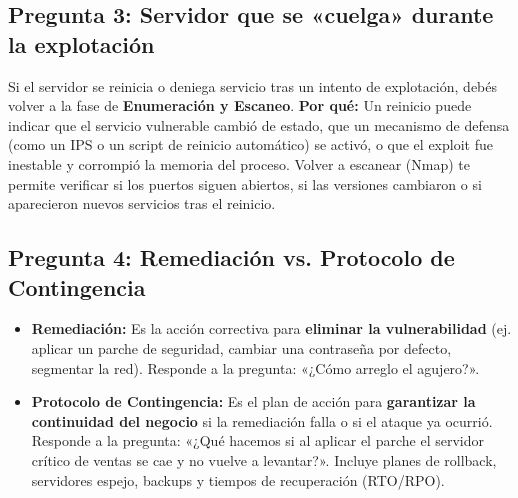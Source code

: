 \documentclass[11pt,a4paper]{article}
\begin{document}
\subsection*{Pregunta 3: Servidor que se «cuelga» durante la explotación}
\begin{respuesta}
Si el servidor se reinicia o deniega servicio tras un intento de explotación, debés volver a la fase de \textbf{Enumeración y Escaneo}.
\textbf{Por qué:} Un reinicio puede indicar que el servicio vulnerable cambió de estado, que un mecanismo de defensa (como un IPS o un script de reinicio automático) se activó, o que el exploit fue inestable y corrompió la memoria del proceso. Volver a escanear (Nmap) te permite verificar si los puertos siguen abiertos, si las versiones cambiaron o si aparecieron nuevos servicios tras el reinicio.
\end{respuesta}

\subsection*{Pregunta 4: Remediación vs. Protocolo de Contingencia}
\begin{respuesta}
\begin{itemize}[leftmargin=*]
  \item \textbf{Remediación:} Es la acción correctiva para \textbf{eliminar la vulnerabilidad} (ej. aplicar un parche de seguridad, cambiar una contraseña por defecto, segmentar la red). Responde a la pregunta: «¿Cómo arreglo el agujero?».
  \item \textbf{Protocolo de Contingencia:} Es el plan de acción para \textbf{garantizar la continuidad del negocio} si la remediación falla o si el ataque ya ocurrió. Responde a la pregunta: «¿Qué hacemos si al aplicar el parche el servidor crítico de ventas se cae y no vuelve a levantar?». Incluye planes de rollback, servidores espejo, backups y tiempos de recuperación (RTO/RPO).
\end{itemize}
\end{respuesta}
\end{document}
